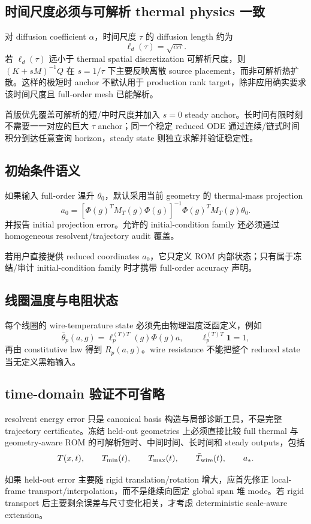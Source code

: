 \subsection{时间尺度必须与可解析 thermal physics 一致}
对 diffusion coefficient $\alpha$，时间尺度 $\tau$ 的 diffusion length 约为
\begin{equation}
\ell_d(\tau)=\sqrt{\alpha\tau}.
\end{equation}
若 $\ell_d(\tau)$ 远小于 thermal spatial discretization 可解析尺度，则 $(K+sM)^{-1}Q$ 在 $s=1/\tau$ 下主要反映离散 source placement，而非可解析热扩散。这样的极短时 anchor 不默认用于 production rank target，除非应用确实要求该时间尺度且 full-order mesh 已能解析。

首版优先覆盖可解析的短/中时尺度并加入 $s=0$ steady anchor。长时间有限时刻不需要一一对应的巨大 $\tau$ anchor；同一个稳定 reduced ODE 通过连续/链式时间积分到达任意查询 horizon，steady state 则独立求解并验证稳定性。

\subsection{初始条件语义}
如果输入 full-order 温升 $\theta_0$，默认采用当前 geometry 的 thermal-mass projection
\begin{equation}
\boxed{
a_0=
[\Phi(g)^TM_T(g)\Phi(g)]^{-1}\Phi(g)^TM_T(g)\theta_0.}
\end{equation}
并报告 initial projection error。允许的 initial-condition family 还必须通过 homogeneous resolvent/trajectory audit 覆盖。

若用户直接提供 reduced coordinates $a_0$，它只定义 ROM 内部状态；只有属于冻结/审计 initial-condition family 时才携带 full-order accuracy 声明。

\subsection{线圈温度与电阻状态}
每个线圈的 wire-temperature state 必须先由物理温度泛函定义，例如
\begin{equation}
\bar\theta_p(a,g)
=\ell_p^{(T)T}(g)\Phi(g)a,
\qquad
\ell_p^{(T)T}\mathbf 1=1,
\end{equation}
再由 constitutive law 得到 $R_p(a,g)$。wire resistance 不能把整个 reduced state 当无定义黑箱输入。

\subsection{time-domain 验证不可省略}
resolvent energy error 只是 canonical basis 构造与局部诊断工具，不是完整 trajectory certificate。冻结 held-out geometries 上必须直接比较 full thermal 与 geometry-aware ROM 的可解析短时、中间时间、长时间和 steady outputs，包括
\begin{equation}
T(x,t),\qquad T_{\min}(t),\qquad T_{\max}(t),\qquad \bar T_{\rm wire}(t),\qquad a_*.
\end{equation}

如果 held-out error 主要随 rigid translation/rotation 增大，应首先修正 local-frame transport/interpolation，而不是继续向固定 global span 堆 mode。若 rigid transport 后主要剩余误差与尺寸变化相关，才考虑 deterministic scale-aware extension。
